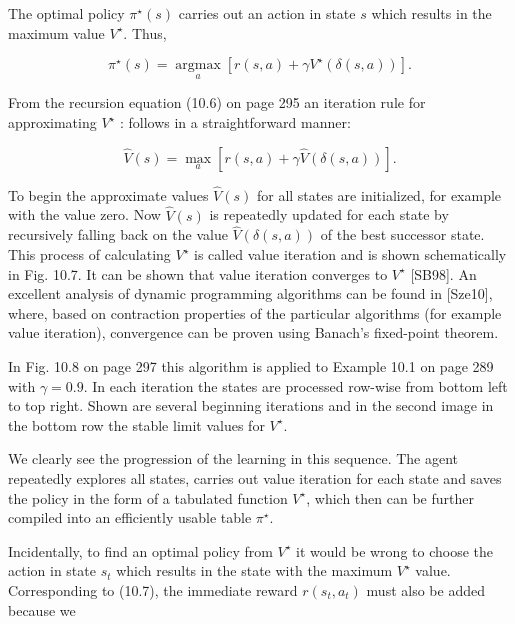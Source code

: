\documentclass[10pt]{article}
\begin{document}
The optimal policy $\pi^{\star}(s)$ carries out an action in state $s$ which results in the maximum value $V^{\star}$. Thus,



\begin{equation*}
\pi^{\star}(s)=\underset{a}{\operatorname{argmax}}\left[r(s, a)+\gamma V^{\star}(\delta(s, a))\right] . \tag{10.7}
\end{equation*}


From the recursion equation (10.6) on page 295 an iteration rule for approximating $V^{\star}$ : follows in a straightforward manner:


\begin{equation*}
\hat{V}(s)=\max _{a}[r(s, a)+\gamma \hat{V}(\delta(s, a))] . \tag{10.8}
\end{equation*}


To begin the approximate values $\hat{V}(s)$ for all states are initialized, for example with the value zero. Now $\hat{V}(s)$ is repeatedly updated for each state by recursively falling back on the value $\hat{V}(\delta(s, a))$ of the best successor state. This process of calculating $V^{\star}$ is called value iteration and is shown schematically in Fig. 10.7. It can be shown that value iteration converges to $V^{\star}$ [SB98]. An excellent analysis of dynamic programming algorithms can be found in [Sze10], where, based on contraction properties of the particular algorithms (for example value iteration), convergence can be proven using Banach's fixed-point theorem.

In Fig. 10.8 on page 297 this algorithm is applied to Example 10.1 on page 289 with $\gamma=0.9$. In each iteration the states are processed row-wise from bottom left to top right. Shown are several beginning iterations and in the second image in the bottom row the stable limit values for $V^{\star}$.

We clearly see the progression of the learning in this sequence. The agent repeatedly explores all states, carries out value iteration for each state and saves the policy in the form of a tabulated function $V^{\star}$, which then can be further compiled into an efficiently usable table $\pi^{\star}$.

Incidentally, to find an optimal policy from $V^{\star}$ it would be wrong to choose the action in state $s_{t}$ which results in the state with the maximum $V^{\star}$ value. Corresponding to (10.7), the immediate reward $r\left(s_{t}, a_{t}\right)$ must also be added because we
\end{document}
